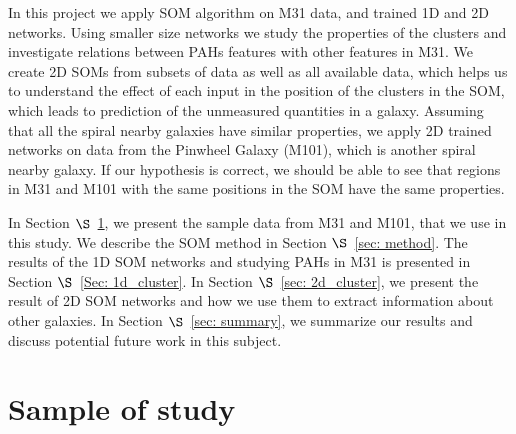 In this project we apply SOM algorithm on M31 data, and trained 1D and 2D networks.
Using smaller size networks we study the properties of the clusters and investigate relations between PAHs features with other features in M31.
We create 2D SOMs from subsets of data as well as all available data, which helps us to understand the effect of each input in the position of the clusters in the SOM, which leads to prediction of the unmeasured quantities in a galaxy.
Assuming that all the spiral nearby galaxies have similar properties, we apply 2D trained networks on data from the Pinwheel Galaxy (M101), which is another spiral nearby galaxy. 
If our hypothesis is correct, we should be able to see that regions in M31 and M101 with the same positions in the SOM have the same properties.

In Section $\S$~\ref{Sec: data_SOMN}, we present the sample data from M31 and M101, that we use in this study. 
We describe the SOM method in Section $\S$~\ref{sec: method}. 
The results of the 1D SOM networks and studying PAHs in M31 is presented in Section $\S$~\ref{Sec: 1d_cluster}.
In Section $\S$~\ref{sec: 2d_cluster}, we present the result of 2D SOM networks and how we use them to extract information about other galaxies.
In Section $\S$~\ref{sec: summary}, we summarize our results and discuss potential future work in this subject.




\section{Sample of study}
\label{Sec: data_SOMN}

